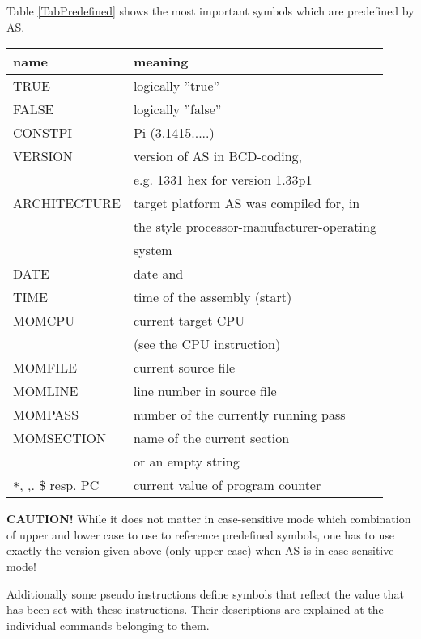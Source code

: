 \documentclass[12pt,twoside]{report}
\newcommand{\bb}[1]{{\bf #1}}
\newcommand{\asname}{{AS}}
\begin{document}
Table \ref{TabPredefined} shows the most important symbols which are
predefined by \asname{}.
\begin{table*}[htb]
\begin{center}\begin{tabular}{|l|l|}
\hline
name          & meaning \\
\hline
\hline
TRUE          & logically ''true'' \\
FALSE         & logically ''false'' \\
CONSTPI       & Pi (3.1415.....) \\
VERSION       & version of \asname{} in BCD-coding, \\
              & e.g. 1331 hex for version 1.33p1 \\
ARCHITECTURE  & target platform \asname{} was compiled for, in \\
              & the style processor-manufacturer-operating \\
              & system \\
DATE          & date and \\
TIME          & time of the assembly (start) \\
MOMCPU        & current target CPU \\
              & (see the CPU instruction) \\
MOMFILE       & current source file \\
MOMLINE       & line number in source file \\
MOMPASS       & number of the currently running pass \\
MOMSECTION    & name of the current section \\
              & or an empty string \\
\verb!*!, ,. \$ resp. PC & current value of program counter \\
\hline
\end{tabular}\end{center}
\caption{Predefined Symbols\label{TabPredefined}}
\end{table*}
\bb{CAUTION!}  While it does not matter in case-sensitive mode which
combination of upper and lower case to use to reference predefined
symbols, one has to use exactly the version given above (only upper
case) when \asname{} is in case-sensitive mode!

Additionally some pseudo instructions define symbols that reflect the
value that has been set  with these instructions.  Their descriptions
are explained at the individual commands belonging to them.
\end{document}
